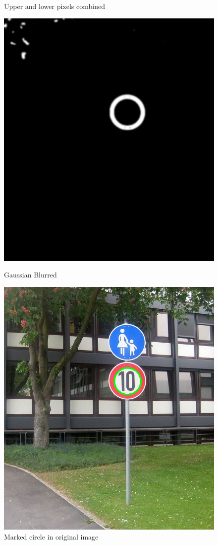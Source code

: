 \begin{figure}[H]
	\caption{Upper and lower pixels combined}\label{fig:combined}
	\endminipage\hfill
	\includegraphics[width=\linewidth]{images/redcombined2.png}
	\caption{Gaussian Blurred}\label{fig:combined_blurred}
	\endminipage\hfill
	\includegraphics[width=\linewidth]{images/detectedcirclescircle.png}
	\caption{Marked circle in original image}\label{fig:detectedcircles}
	\endminipage
	
\end{figure}

